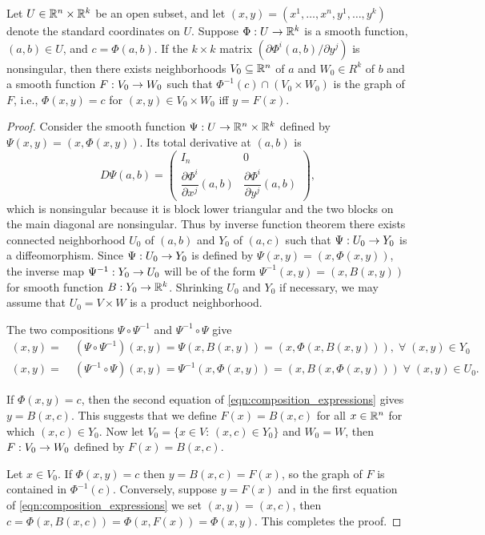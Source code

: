 \documentclass[11pt,a4paper]{article}
\begin{document}
\begin{proposition}
Let $U\in \mathbb{R}^n\times \mathbb{R}^k$ be an open subset, and let $(x,y) = (x^1,\ldots,x^n,y^1,\ldots,y^k)$ denote the standard coordinates on $U$. Suppose $\Phi:U\rightarrow \mathbb{R}^k$ is a smooth function, $(a,b)\in U$, and $c = \Phi(a,b)$. If the $k\times k$ matrix $(\partial \Phi^i(a,b)/\partial y^j)$ is nonsingular, then there exists neighborhoods $V_0\subseteq \mathbb{R}^n$ of $a$ and $W_0\in R^k$ of $b$ and a smooth function $F:V_0\rightarrow W_0$ such that $\Phi^{-1}(c)\cap (V_0\times W_0)$ is the graph of $F$, i.e., $\Phi(x,y) = c$ for $(x,y)\in V_0\times W_0$ iff $y = F(x)$.
\end{proposition}

\begin{proof}
Consider the smooth function $\Psi:U\rightarrow \mathbb{R}^n\times \mathbb{R}^k$ defined by $\Psi(x,y) = (x,\Phi(x,y))$. Its total derivative at $(a,b)$ is
\begin{equation*}
D\Psi(a,b) = \left(
\begin{array}{cc} 
I_n & 0 \\ 
\dfrac{\partial \Phi^i}{\partial x^j}(a,b) & \dfrac{\partial \Phi^i}{\partial y^j}(a,b)
\end{array} \right),
\end{equation*}
which is nonsingular because it is block lower triangular and the two blocks on the main diagonal are nonsingular. Thus by inverse function theorem there exists connected neighborhood $U_0$ of $(a,b)$ and $Y_0$ of $(a,c)$ such that $\Psi:U_0\rightarrow Y_0$ is a diffeomorphism. Since $\Psi:U_0\rightarrow Y_0$ is defined by $\Psi(x,y) = (x,\Phi(x,y))$, the inverse map $\Psi^{-1}:Y_0\rightarrow U_0$ will be of the form $\Psi^{-1}(x,y) = (x,B(x,y))$ for smooth function $B:Y_0\rightarrow \mathbb{R}^k$. Shrinking $U_0$ and $Y_0$ if necessary, we may assume that $U_0 = V\times W$ is a product neighborhood.

The two compositions $\Psi\circ\Psi^{-1}$ and $\Psi^{-1}\circ\Psi$ give
\begin{align}
(x,y) =&\; (\Psi\circ\Psi^{-1})(x,y) = \Psi(x,B(x,y)) = (x,\Phi(x,B(x,y))),\; \forall\;(x,y)\in Y_0\nonumber\\
(x,y) =&\; (\Psi^{-1}\circ\Psi)(x,y) = \Psi^{-1}(x,\Phi(x,y)) = (x,B(x,\Phi(x,y)))\; \forall\;(x,y)\in U_0.\label{eqn:composition_expressions}
\end{align}

If $\Phi(x,y) = c$, then the second equation of \eqref{eqn:composition_expressions} gives $y = B(x,c)$. This suggests that we define $F(x) = B(x,c)$ for all $x\in \mathbb{R}^n$ for which $(x,c)\in Y_0$. Now let $V_0 = \{x\in V:\,(x,c)\in Y_0\}$ and $W_0 = W$, then $F:V_0\rightarrow W_0$ defined by $F(x) = B(x,c)$. 

Let $x\in V_0$. If $\Phi(x,y) = c$ then $y = B(x,c) = F(x)$, so the graph of $F$ is contained in $\Phi^{-1}(c)$. Conversely, suppose $y = F(x)$ and in the first equation of \eqref{eqn:composition_expressions} we set $(x,y) = (x,c)$, then $c = \Phi(x,B(x,c)) = \Phi(x,F(x)) = \Phi(x,y)$. This completes the proof.
\end{proof}
\end{document}
